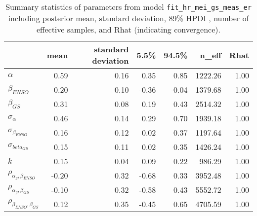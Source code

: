 \begin{table}[ht]
\centering
\begin{tabular}{lrrrrrr}
  \hline
 & mean & standard deviation & 5.5\% & 94.5\% & n\_eff & Rhat \\ 
  \hline
$\alpha$ & 0.59 & 0.16 & 0.35 & 0.85 & 1222.26 & 1.00 \\ 
  $\beta_{ENSO}$ & -0.20 & 0.10 & -0.36 & -0.04 & 1379.68 & 1.00 \\ 
  $\beta_{GS}$ & 0.31 & 0.08 & 0.19 & 0.43 & 2514.32 & 1.00 \\ 
  $\sigma_{\alpha}$ & 0.46 & 0.14 & 0.29 & 0.70 & 1939.18 & 1.00 \\ 
  $\sigma_{\beta_{ENSO}}$ & 0.16 & 0.12 & 0.02 & 0.37 & 1197.64 & 1.00 \\ 
  $\sigma_{beta_{GS}}$ & 0.15 & 0.11 & 0.02 & 0.35 & 1426.24 & 1.00 \\ 
  $k$ & 0.15 & 0.04 & 0.09 & 0.22 & 986.29 & 1.00 \\ 
  $\rho_{\alpha_g,\beta_{ENSO}}$ & -0.20 & 0.32 & -0.68 & 0.33 & 3952.48 & 1.00 \\ 
  $\rho_{\alpha_g,\beta_{GS}}$ & -0.10 & 0.32 & -0.58 & 0.43 & 5552.72 & 1.00 \\ 
  $\rho_{\beta_{ENSO},\beta_{GS}}$ & 0.12 & 0.35 & -0.45 & 0.65 & 4705.59 & 1.00 \\ 
   \hline
\end{tabular}
\caption{Summary statistics of parameters from model  \texttt{fit\_hr\_mei\_gs\_meas\_er} including posterior mean, standard deviation, 89\% HPDI , number of effective samples, and Rhat (indicating convergence).} 
\label{tab:precis_hr_mei_gs_me}
\end{table}
